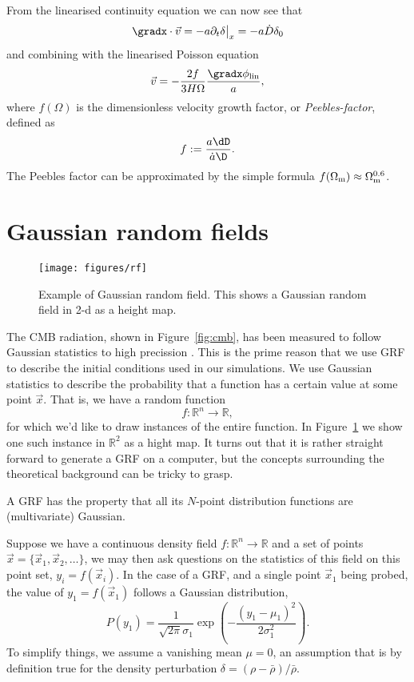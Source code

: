 \begin{subappendices}
From the linearised continuity equation we can now see that
\[\gradx \cdot \vec{v} = -a \partial_t \delta\big|_x = -a \dot{D} \delta_0\]
and combining with the linearised Poisson equation
\[\vec{v} = -\frac{2 f}{3H\Omega} \frac{\gradx \phi_{\rm lin}}{a},\]
where $f(\Omega)$ is the dimensionless velocity growth factor, or \emph{Peebles-factor},
defined as
\[f := \frac{a \dD}{\dot{a} \D}.\]
The Peebles factor can be approximated by the simple formula $f(\Omega_{\rm m})
\approx \Omega_{\rm m}^{0.6}$.

\clearpage
\section{Gaussian random fields}\label{section:gaussianfluctuations}
\begin{figure}
    \centering
    \texttt{[image: figures/rf]}
    \caption{Example of Gaussian random field. This shows a Gaussian random field in 2-d as a height map.} \label{fig:random-field}
\end{figure}

The CMB radiation, shown in Figure~\ref{fig:cmb}, has been measured to follow Gaussian statistics to high precission \citep{Komatsu2003,Planck2013-pp}.  This is the prime reason that we use \acf{GRF} to describe the initial conditions used in our simulations. We use Gaussian statistics to describe the probability that a function has a certain value at some point $\vec{x}$. That is, we have a random function
\[f: \mathbb{R}^n \to \mathbb{R},\]
for which we'd like to draw instances of the entire function. In Figure~\ref{fig:random-field} we show one such instance in $\mathbb{R}^2$ as a hight map. It turns out that it is rather straight forward to generate a \ac{GRF} on a computer, but the concepts surrounding the theoretical background can be tricky to grasp.

\begin{definition}[GRF]
A \ac{GRF} has the property that all its $N$-point distribution functions are (multivariate) Gaussian.
\end{definition}

Suppose we have a continuous density field $f: \mathbb{R}^n \to \mathbb{R}$ and a set of points $\vec{x} = \{\vec{x}_1, \vec{x}_2, \dots\}$, we may then ask questions on the statistics of this field on this point set, $y_i = f(\vec{x}_i)$. In the case of a \ac{GRF}, and a single point $\vec{x}_1$ being probed, the value of $y_1 = f(\vec{x}_1)$ follows a Gaussian distribution,
\[P(y_1) = \frac{1}{\sqrt{2\pi} \sigma_1} \exp\left(-\frac{{(y_1 - \mu_1)}^2}{2 \sigma_1^2}\right).\]
To simplify things, we assume a vanishing mean $\mu = 0$, an assumption that is by definition true for the density perturbation $\delta = (\rho - \bar{\rho})/\bar{\rho}$.


\end{subappendices}
